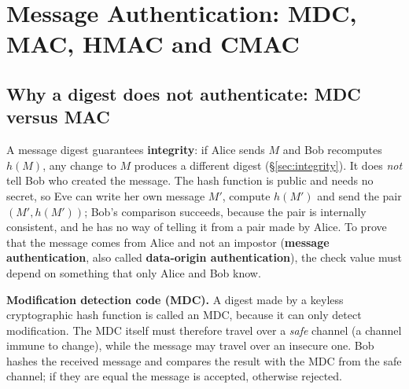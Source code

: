 \section{Message Authentication: MDC, MAC, HMAC and CMAC}\label{sec:mac}
\usetikzlibrary{decorations.pathreplacing}

\subsection{Why a digest does not authenticate: MDC versus MAC \new}

A message digest guarantees \textbf{integrity}: if Alice sends $M$ and Bob recomputes $h(M)$, any change to $M$ produces a different digest (\S\ref{sec:integrity}). It does \emph{not} tell Bob who created the message. The hash function is public and needs no secret, so Eve can write her own message $M'$, compute $h(M')$ and send the pair $(M', h(M'))$; Bob's comparison succeeds, because the pair is internally consistent, and he has no way of telling it from a pair made by Alice. To prove that the message comes from Alice and not an impostor (\textbf{message authentication}, also called \textbf{data-origin authentication}), the check value must depend on something that only Alice and Bob know.

\textbf{Modification detection code (MDC).} A digest made by a keyless cryptographic hash function is called an MDC, because it can only detect modification. The MDC itself must therefore travel over a \emph{safe} channel (a channel immune to change), while the message may travel over an insecure one. Bob hashes the received message and compares the result with the MDC from the safe channel; if they are equal the message is accepted, otherwise rejected.

